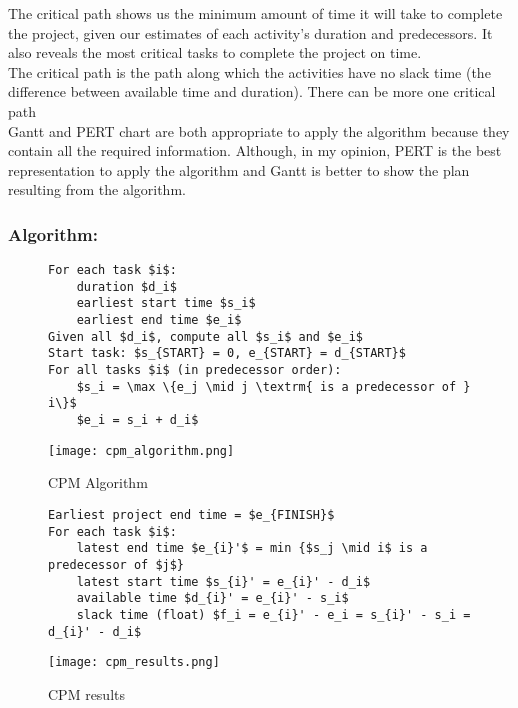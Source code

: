 The critical path shows us the minimum amount of time it will take to complete the project,
given our estimates of each activity’s duration and predecessors. It also reveals the most critical tasks to complete the project on time.\\

The critical path is the path along which the activities have no slack time (the difference between available time and duration). There can be more one critical path\\

Gantt and PERT chart are both appropriate to apply the algorithm because they contain all the
required information. Although, in my opinion, PERT is the best representation to apply the
algorithm and Gantt is better to show the plan resulting from the algorithm.

\subsubsection{Algorithm:}

\begin{figure}[!ht]
\begin{minipage}[t]{\linewidth}
    \begin{minipage}[c]{0.6\linewidth}
        \begin{lstlisting}[mathescape, frame=single, caption={CPM Algorithm},captionpos=b]
For each task $i$:
    duration $d_i$
    earliest start time $s_i$
    earliest end time $e_i$
Given all $d_i$, compute all $s_i$ and $e_i$
Start task: $s_{START} = 0, e_{START} = d_{START}$
For all tasks $i$ (in predecessor order):
    $s_i = \max \{e_j \mid j \textrm{ is a predecessor of } i\}$
    $e_i = s_i + d_i$
        \end{lstlisting}
    \end{minipage}
    \begin{minipage}[c]{0.35\linewidth}
        \texttt{[image: cpm\_algorithm.png]}
        \caption{CPM Algorithm}
    \end{minipage}
\end{minipage}
    \begin{minipage}{0.8\linewidth}
		\begin{lstlisting}[mathescape, frame=single, caption={CPM results}, captionpos=b]
Earliest project end time = $e_{FINISH}$
For each task $i$:
	latest end time $e_{i}'$ = min {$s_j \mid i$ is a predecessor of $j$}
	latest start time $s_{i}' = e_{i}' - d_i$
	available time $d_{i}' = e_{i}' - s_i$
	slack time (float) $f_i = e_{i}' - e_i = s_{i}' - s_i = d_{i}' - d_i$
		\end{lstlisting}
		\centering
    \texttt{[image: cpm\_results.png]}
    \caption{CPM results}
	\end{minipage}
\end{figure}
\FloatBarrier{}


